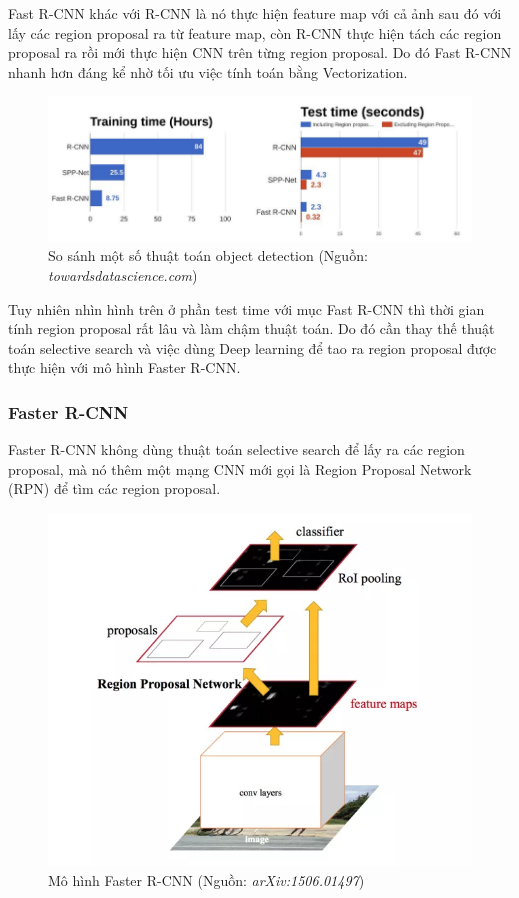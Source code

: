 \documentclass[a4paper, 12pt]{report}
\begin{document}
Fast R-CNN khác với R-CNN là nó thực hiện feature map với cả ảnh sau đó với lấy các region proposal ra từ feature map, còn R-CNN thực hiện tách các region proposal ra rồi mới thực hiện CNN trên từng region proposal. Do đó Fast R-CNN nhanh hơn đáng kể nhờ tối ưu việc tính toán bằng Vectorization. \par
\begin{figure}[!h]
	\centering
	\includegraphics[width=1\linewidth]{Images/time}
	\caption{So sánh một số thuật toán object detection (Nguồn: \textit{towardsdatascience.com})}
	\label{fig:time}
\end{figure}
Tuy nhiên nhìn hình trên ở phần test time với mục Fast R-CNN thì thời gian tính region proposal rất lâu và làm chậm thuật toán. Do đó cần thay thế thuật toán selective search và việc dùng Deep learning để tao ra region proposal được thực hiện với mô hình Faster R-CNN.\par
\subsubsection{Faster R-CNN}
Faster R-CNN không dùng thuật toán selective search để lấy ra các region proposal, mà nó thêm một mạng CNN mới gọi là Region Proposal Network (RPN) để tìm các region proposal.\par
\begin{figure}[!h]
	\centering
	\includegraphics[width=0.7\linewidth]{Images/fasterrcnn}
	\caption{Mô hình Faster R-CNN (Nguồn: \textit{arXiv:1506.01497})}
	\label{fig:fasterrcnn}
\end{figure}
\end{document}
